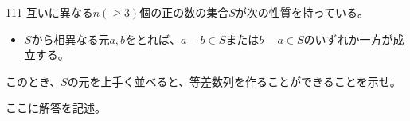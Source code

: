\begin{prob}{111}{}{}
 互いに異なる$n (\ge 3)$個の正の数の集合$S$が次の性質を持っている。
 \begin{itemize}
  \item[性質:] $S$から相異なる元$a, b$をとれば、$a-b\in S$または$b-a\in S$のいずれか一方が成立する。
 \end{itemize}
 このとき、$S$の元を上手く並べると、等差数列を作ることができることを示せ。
\end{prob}
ここに解答を記述。